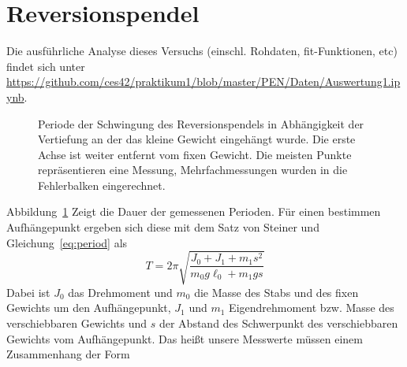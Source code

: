 \section{Reversionspendel}

\setlength{\parindent}{4ex}

Die ausführliche Analyse dieses Versuchs (einschl. Rohdaten, fit-Funktionen, etc) findet sich unter \url{https://github.com/ces42/praktikum1/blob/master/PEN/Daten/Auswertung1.ipynb}.
\\

\begin{figure}    
    \caption{Periode der Schwingung des Reversionspendels in Abhängigkeit der Vertiefung an der das kleine Gewicht eingehängt wurde. Die erste Achse ist weiter entfernt vom fixen Gewicht. Die meisten Punkte repräsentieren eine Messung, Mehrfachmessungen wurden in die Fehlerbalken eingerechnet.}
    \label{diag:rev}
\end{figure}
\noindent
Abbildung~\ref{diag:rev} Zeigt die Dauer der gemessenen Perioden. Für einen bestimmen Aufhängepunkt ergeben sich diese mit dem Satz von Steiner und Gleichung~\ref{eq:period} als
\[
    T = 2 \pi \sqrt{\frac{J_0 + J_1 + m_1 s^2}{m_0 g \ell_0 + m_1 g s}}
\]
Dabei ist $J_0$ das Drehmoment und $m_0$ die Masse des Stabs und des fixen Gewichts um den Aufhängepunkt, $J_1$ und $m_1$ Eigendrehmoment bzw. Masse des verschiebbaren Gewichts und $s$ der Abstand des Schwerpunkt des verschiebbaren Gewichts vom Aufhängepunkt. Das heißt unsere Messwerte müssen einem Zusammenhang der Form
